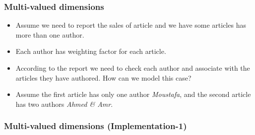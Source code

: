 \begin{frame}
	\frametitle{Multi-valued dimensions}
	\begin{example}
		\begin{itemize}[<+->]
			\item Assume we need to report the sales of article and we have some articles has more than one author.
			\item Each author has weighting factor for each article.
			\item According to the report we need to check each author and associate with the articles they have authored. How can we model this case?
			\item Assume the first article has only one author \textit{Moustafa}, and the second article has two authors \textit{Ahmed \& Amr}.
		\end{itemize}
	\end{example}

\begin{table}
	\caption{author and articles sample data.}
\end{table}

\end{frame}
\begin{frame}
\frametitle{Multi-valued dimensions (Implementation-1)}



\end{frame}
